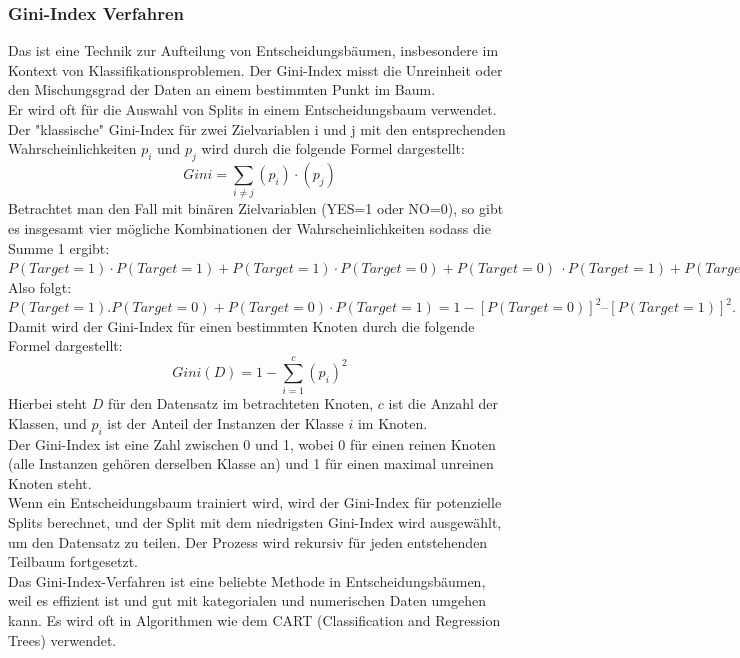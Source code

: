 \documentclass[12pt]{article}
\begin{document}
\subsubsection{Gini-Index Verfahren}
%
Das {\color{blue}{Gini-Index Verfahren}} ist eine Technik zur Aufteilung von Entscheidungsbäumen, insbesondere im Kontext von Klassifikationsproblemen. Der Gini-Index misst die Unreinheit oder den Mischungsgrad der Daten an einem bestimmten Punkt im Baum.\\
Er wird oft für die Auswahl von Splits in einem Entscheidungsbaum verwendet. \\
Der "klassische" Gini-Index für zwei Zielvariablen i und j mit den entsprechenden Wahrscheinlichkeiten $p_i$ und $p_j$ wird durch die folgende Formel dargestellt:
\[
Gini = \sum_{i \neq j} (p_i)\cdot(p_j)
\]
%
Betrachtet man den Fall mit binären Zielvariablen (YES=1 oder NO=0), so gibt es insgesamt vier mögliche Kombinationen der Wahrscheinlichkeiten sodass die Summe 1 ergibt:\\
$P(Target=1)\cdot P(Target=1)+ P(Target=1)\cdot P(Target=0) + P(Target=0)\ \cdot P(Target=1) + P(Target=0) \cdot P(Target=0) = 1.$\\
Also folgt: \\
$P(Target=1).P(Target=0) + P(Target=0)\cdot P(Target=1)= 1 - [P(Target=0)]^2 – [P(Target=1)]^2.$  \\[0.3cm]
Damit wird der Gini-Index für einen bestimmten Knoten durch die folgende Formel dargestellt:
\[
Gini(D) = 1 - \sum_{i=1}^{c} (p_i)^2
\]
%
Hierbei steht \(D\) für den Datensatz im betrachteten Knoten, \(c\) ist die Anzahl der Klassen, und \(p_i\) ist der Anteil der Instanzen der Klasse \(i\) im Knoten.\\[0.2cm]
Der Gini-Index ist eine Zahl zwischen 0 und 1, wobei 0 für einen reinen Knoten (alle Instanzen gehören derselben Klasse an) und 1 für einen maximal unreinen Knoten steht.\\
Wenn ein Entscheidungsbaum trainiert wird, wird der Gini-Index für potenzielle Splits berechnet, und der Split mit dem niedrigsten Gini-Index wird ausgewählt, um den Datensatz zu teilen. Der Prozess wird rekursiv für jeden entstehenden Teilbaum fortgesetzt.\\
Das Gini-Index-Verfahren ist eine beliebte Methode in Entscheidungsbäumen, weil es effizient ist und gut mit kategorialen und numerischen Daten umgehen kann. Es wird oft in Algorithmen wie dem CART (Classification and Regression Trees) verwendet.\\[0.2cm]
\end{document}
